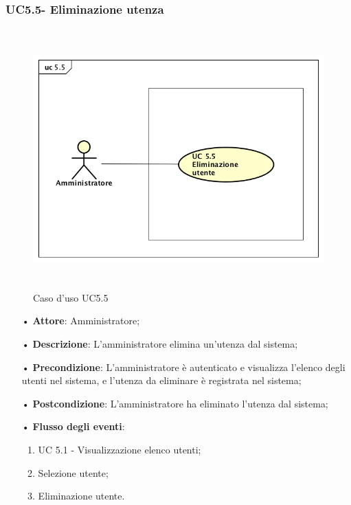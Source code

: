 \subsubsection{UC5.5- Eliminazione utenza}
\begin{figure}[H]
\centering
\includegraphics[width=17cm, height=10cm]{img/UC55.png} 
\caption{Caso d'uso UC5.5}
\end{figure}
\begin{itemize}
\item[•] \textbf{Attore}: Amministratore;

\item[•] \textbf{Descrizione}: L’amministratore elimina un’utenza dal sistema;

\item[•] \textbf{Precondizione}: L’amministratore \`{e} autenticato e visualizza l’elenco degli utenti nel sistema, e l’utenza da eliminare \`{e} registrata nel sistema;

\item[•] \textbf{Postcondizione}: L'amministratore ha eliminato l'utenza dal sistema; 

\item[•] \textbf{Flusso degli eventi}:

\begin{enumerate}

\item UC 5.1 - Visualizzazione elenco utenti;

\item Selezione utente;

\item Eliminazione utente.

\end{enumerate}

\end{itemize}
